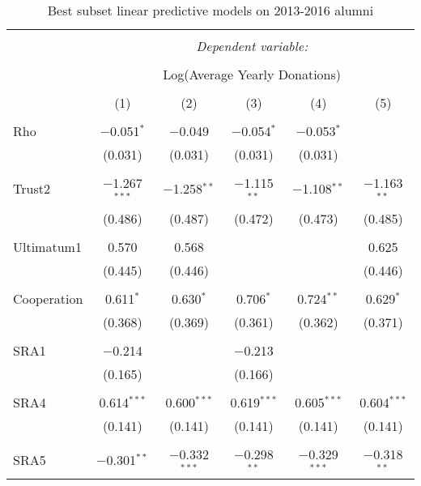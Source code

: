 \newpage

\begin{table}[!htbp] \centering 
  \caption{Best subset linear predictive models on 2013-2016 alumni} 
  \label{} 
      \begin{adjustbox}{width=\textwidth}
\begin{tabular}{@{\extracolsep{5pt}}lccccc} 
\\[-1.8ex]\hline 
\hline \\[-1.8ex] 
 & \multicolumn{5}{c}{\textit{Dependent variable:}} \\ 
\cline{2-6} 
\\[-1.8ex] & \multicolumn{5}{c}{Log(Average Yearly Donations)} \\ 
\\[-1.8ex] & (1) & (2) & (3) & (4) & (5)\\ 
\hline \\[-1.8ex] 
 Rho & $-$0.051$^{*}$ & $-$0.049 & $-$0.054$^{*}$ & $-$0.053$^{*}$ &  \\ 
  & (0.031) & (0.031) & (0.031) & (0.031) &  \\ 
  & & & & & \\ 
 Trust2 & $-$1.267$^{***}$ & $-$1.258$^{**}$ & $-$1.115$^{**}$ & $-$1.108$^{**}$ & $-$1.163$^{**}$ \\ 
  & (0.486) & (0.487) & (0.472) & (0.473) & (0.485) \\ 
  & & & & & \\ 
 Ultimatum1 & 0.570 & 0.568 &  &  & 0.625 \\ 
  & (0.445) & (0.446) &  &  & (0.446) \\ 
  & & & & & \\ 
 Cooperation & 0.611$^{*}$ & 0.630$^{*}$ & 0.706$^{*}$ & 0.724$^{**}$ & 0.629$^{*}$ \\ 
  & (0.368) & (0.369) & (0.361) & (0.362) & (0.371) \\ 
  & & & & & \\ 
 SRA1 & $-$0.214 &  & $-$0.213 &  &  \\ 
  & (0.165) &  & (0.166) &  &  \\ 
  & & & & & \\ 
 SRA4 & 0.614$^{***}$ & 0.600$^{***}$ & 0.619$^{***}$ & 0.605$^{***}$ & 0.604$^{***}$ \\ 
  & (0.141) & (0.141) & (0.141) & (0.141) & (0.141) \\ 
  & & & & & \\ 
 SRA5 & $-$0.301$^{**}$ & $-$0.332$^{***}$ & $-$0.298$^{**}$ & $-$0.329$^{***}$ & $-$0.318$^{**}$ \\ 

\end{tabular}
\end{adjustbox}
\end{table}
